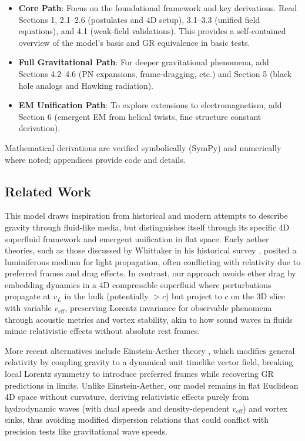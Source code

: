 \documentclass{article}
\begin{document}
\begin{itemize}
    \item \textbf{Core Path}: Focus on the foundational framework and key derivations. Read Sections 1, 2.1--2.6 (postulates and 4D setup), 3.1--3.3 (unified field equations), and 4.1 (weak-field validations). This provides a self-contained overview of the model's basis and GR equivalence in basic tests.
    \item \textbf{Full Gravitational Path}: For deeper gravitational phenomena, add Sections 4.2--4.6 (PN expansions, frame-dragging, etc.) and Section 5 (black hole analogs and Hawking radiation).
    \item \textbf{EM Unification Path}: To explore extensions to electromagnetism, add Section 6 (emergent EM from helical twists, fine structure constant derivation).
\end{itemize}

Mathematical derivations are verified symbolically (SymPy) and numerically where noted; appendices provide code and details.

\subsection{Related Work}

This model draws inspiration from historical and modern attempts to describe gravity through fluid-like media, but distinguishes itself through its specific 4D superfluid framework and emergent unification in flat space. Early aether theories, such as those discussed by Whittaker in his historical survey \cite{whittaker1951history}, posited a luminiferous medium for light propagation, often conflicting with relativity due to preferred frames and drag effects. In contrast, our approach avoids ether drag by embedding dynamics in a 4D compressible superfluid where perturbations propagate at $v_L$ in the bulk (potentially $>c$) but project to $c$ on the 3D slice with variable $v_{\text{eff}}$, preserving Lorentz invariance for observable phenomena through acoustic metrics and vortex stability, akin to how sound waves in fluids mimic relativistic effects without absolute rest frames.

More recent alternatives include Einstein-Aether theory \cite{jacobson2004einstein}, which modifies general relativity by coupling gravity to a dynamical unit timelike vector field, breaking local Lorentz symmetry to introduce preferred frames while recovering GR predictions in limits. Unlike Einstein-Aether, our model remains in flat Euclidean 4D space without curvature, deriving relativistic effects purely from hydrodynamic waves (with dual speeds and density-dependent $v_{\text{eff}}$) and vortex sinks, thus avoiding modified dispersion relations that could conflict with precision tests like gravitational wave speeds.
\end{document}
